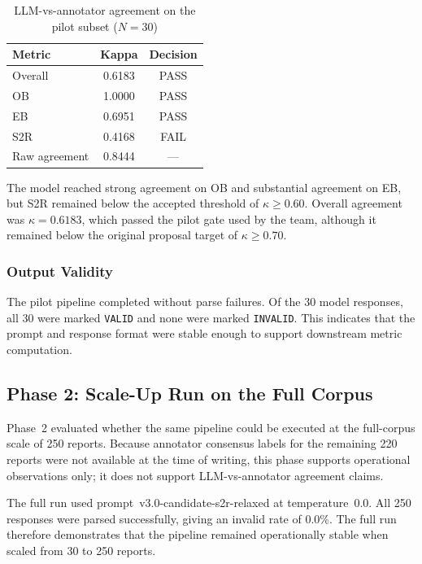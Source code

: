 \begin{table}[t]
\caption{LLM-vs-annotator agreement on the pilot subset ($N=30$)}
\label{tab:llm_kappa}
\centering
\begin{tabular}{lcc}
\hline
\textbf{Metric} & \textbf{Kappa} & \textbf{Decision} \\
\hline
Overall & 0.6183 & PASS \\
OB      & 1.0000 & PASS \\
EB      & 0.6951 & PASS \\
S2R     & 0.4168 & FAIL \\
\hline
Raw agreement & 0.8444 & --- \\
\hline
\end{tabular}
\end{table}

The model reached strong agreement on OB and substantial agreement on
EB, but S2R remained below the accepted threshold of
$\kappa \geq 0.60$. Overall agreement was $\kappa = 0.6183$, which
passed the pilot gate used by the team, although it remained below the
original proposal target of $\kappa \geq 0.70$.

\subsubsection{Output Validity}

The pilot pipeline completed without parse failures. Of the 30 model
responses, all 30 were marked \texttt{VALID} and none were marked
\texttt{INVALID}. This indicates that the prompt and response format
were stable enough to support downstream metric computation.

\subsection{Phase 2: Scale-Up Run on the Full Corpus}

Phase~2 evaluated whether the same pipeline could be executed at the
full-corpus scale of 250 reports. Because annotator consensus labels
for the remaining 220 reports were not available at the time of
writing, this phase supports operational observations only; it does not
support LLM-vs-annotator agreement claims.

The full run used prompt~v3.0-candidate-s2r-relaxed at
temperature~0.0. All 250 responses were parsed successfully, giving an
invalid rate of 0.0\%. The full run therefore demonstrates that the
pipeline remained operationally stable when scaled from 30 to 250
reports.

